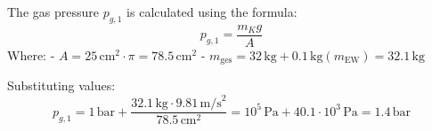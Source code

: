 The gas pressure \( p_{g,1} \) is calculated using the formula:  
\[
p_{g,1} = \frac{m_K g}{A}
\]  
Where:  
- \( A = 25 \, \text{cm}^2 \cdot \pi = 78.5 \, \text{cm}^2 \)  
- \( m_{\text{ges}} = 32 \, \text{kg} + 0.1 \, \text{kg} (m_{\text{EW}}) = 32.1 \, \text{kg} \)  

Substituting values:  
\[
p_{g,1} = 1 \, \text{bar} + \frac{32.1 \, \text{kg} \cdot 9.81 \, \text{m/s}^2}{78.5 \, \text{cm}^2} = 10^5 \, \text{Pa} + 40.1 \cdot 10^3 \, \text{Pa} = 1.4 \, \text{bar}
\]